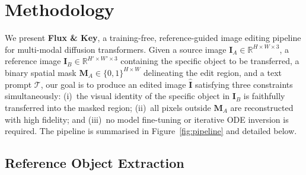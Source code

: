 \section{Methodology}

We present \textbf{Flux \& Key}, a training-free, reference-guided image editing pipeline
for multi-modal diffusion transformers.
Given a source image $\mathbf{I}_A \in \mathbb{R}^{H \times W \times 3}$, a reference image
$\mathbf{I}_B \in \mathbb{R}^{H' \times W' \times 3}$ containing the specific object to be
transferred, a binary spatial mask $\mathbf{M}_A \in \{0,1\}^{H \times W}$ delineating the
edit region, and a text prompt $\mathcal{T}$, our goal is to produce an edited image
$\hat{\mathbf{I}}$ satisfying three constraints simultaneously:
(i)~the visual identity of the specific object in $\mathbf{I}_B$ is faithfully transferred
into the masked region;
(ii)~all pixels outside $\mathbf{M}_A$ are reconstructed with high fidelity; and
(iii)~no model fine-tuning or iterative ODE inversion is required.
The pipeline is summarised in Figure~\ref{fig:pipeline} and detailed below.

\subsection{Reference Object Extraction}

